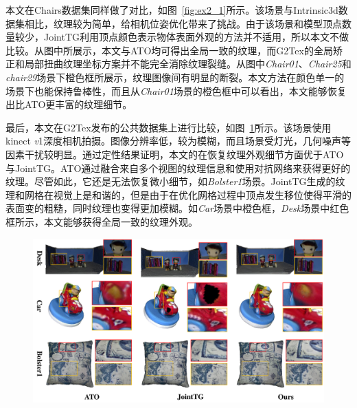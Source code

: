 本文在Chairs数据集同样做了对比，如图~\ref{fig:ex2_1}所示。该场景与Intrinsic3d数据集相比，纹理较为简单，给相机位姿优化带来了挑战。由于该场景和模型顶点数量较少，JointTG利用顶点颜色表示物体表面外观的方法并不适用，所以本文不做比较。从图中所展示，本文与ATO均可得出全局一致的纹理，而G2Tex的全局矫正和局部扭曲纹理坐标方案并不能完全消除纹理裂缝。从图中\emph{Chair01}、\emph{Chair25}和\emph{chair29}场景下橙色框所展示，纹理图像间有明显的断裂。本文方法在颜色单一的场景下也能保持鲁棒性，而且从\emph{Chair01}场景的橙色框中可以看出，本文能够恢复出比ATO更丰富的纹理细节。\par

最后，本文在G2Tex发布的公共数据集上进行比较，如图~\ref{fig:ex2_2}所示。该场景使用kinect \emph{v}1深度相机拍摄。图像分辨率低，较为模糊，而且场景受灯光，几何噪声等因素干扰较明显。通过定性结果证明，本文的在恢复纹理外观细节方面优于ATO与JointTG。ATO通过融合来自多个视图的纹理信息和使用对抗网络来获得更好的纹理。尽管如此，它还是无法恢复微小细节，如\emph{Bolster1}场景。JointTG生成的纹理和网格在视觉上是和谐的，但是由于在优化网格过程中顶点发生移位使得平滑的表面变的粗糙，同时纹理也变得更加模糊。如\emph{Car}场景中橙色框，\emph{Desk}场景中红色框所示，本文能够获得全局一致的纹理外观。\par

\begin{figure}[!t]
\centering
\includegraphics[width=1\linewidth]{pic/work2/compare2.pdf}
\label{fig:ex2_2}
\end{figure}



